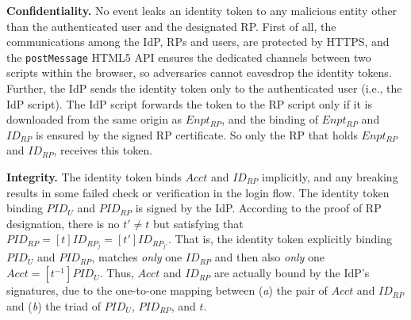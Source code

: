 %

\vspace{0.8mm}
\noindent\textbf{Confidentiality.}
No event leaks an identity token to any malicious entity other than the authenticated user and the designated RP.
First of all, the communications among the IdP, RPs and users,
    are protected by HTTPS,
    and the \verb+postMessage+ HTML5 API ensures the dedicated channels between two scripts within the browser,
    so adversaries cannot eavesdrop the identity tokens.
Further, the IdP sends the identity token only to the authenticated user
        (i.e., the IdP script).
The IdP script forwards the token to the RP script
 only if it is downloaded from the same origin as $Enpt_{RP}$,
and the binding of $Enpt_{RP}$ and $ID_{RP}$ is ensured by the signed RP certificate.
So only the RP that holds $Enpt_{RP}$ and $ID_{RP}$,
    receives this token.


\vspace{0.8mm}
\noindent\textbf{Integrity.}
The identity token binds $Acct$ and $ID_{RP}$ implicitly,
    and any breaking results in some failed check or verification in the login flow.
The identity token binding $PID_U$ and $PID_{RP}$ is signed by the IdP.
According to the proof of RP designation,
    there is no $t' \neq t$ but satisfying that $PID_{RP} = [t]ID_{RP_j} = [t']ID_{RP_{j'}}$.
That is, the identity token explicitly binding $PID_U$ and $PID_{RP}$,
    matches \emph{only} one $ID_{RP}$ and then also \emph{only} one $Acct = [t^{-1}]PID_{U}$.
Thus,
    $Acct$ and $ID_{RP}$ are actually bound by the IdP's signatures,
        due to the one-to-one mapping between (\emph{a}) the pair of $Acct$ and $ID_{RP}$ and (\emph{b}) the triad of $PID_U$, $PID_{RP}$, and $t$.


